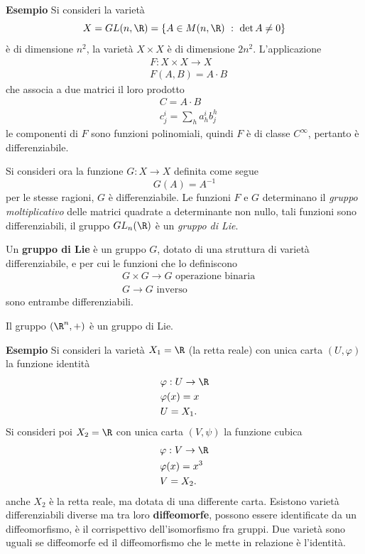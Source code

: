 \documentclass[10pt, letterpaper]{report}
\begin{document}
 \textbf{Esempio} Si consideri la varietà\begin{equation}
    X=GL(n,\R)=\{A\in M(n,\R) \ : \ \det A\ne 0\}
 \end{equation}
 è di dimensione $n^2$, la varietà $X\times X$ è di dimensione $2n^2$. L'applicazione\begin{align}
   & F:X\times X\rightarrow X\\ 
   &F(A,B)=A\cdot B
 \end{align}
 che associa a due matrici il loro prodotto\begin{align}
    &C=A\cdot B\\ 
    &c_j^i=\sum_h a_h^ib_j^h
 \end{align}
 le componenti di $F$ sono funzioni polinomiali, quindi $F$ è di classe $C^\infty$, pertanto è differenziabile.\bigskip

 Si consideri ora la funzione $G:X\rightarrow X$ definita come segue\begin{equation}
    G(A)=A^{-1}
 \end{equation}
 per le stesse ragioni, $G$ è differenziabile. Le funzioni $F$ e $G$ determinano il \textit{gruppo moltiplicativo} delle matrici quadrate a determinante non nullo, tali funzioni sono differenziabili, il gruppo $GL_n(\R)$ è un \textit{gruppo di Lie}.
 \begin{definizione}
    Un \textbf{gruppo di Lie} è un gruppo $G$, dotato di una struttura di varietà differenziabile, e per cui le funzioni che lo definiscono \begin{align}
        & G\times G\rightarrow G\text{ operazione binaria}\\ 
       & G\rightarrow G \text{ inverso}
    \end{align}
    sono entrambe differenziabili.
 \end{definizione}
 Il gruppo $(\R^n,+)$ è un gruppo di Lie.\bigskip

 \noindent\textbf{Esempio} Si consideri la varietà $X_1=\R$ (la retta reale) con unica carta $(U,\varphi)$ la funzione identità\begin{align}
    &\varphi:U\rightarrow \R\\ 
    &\varphi(x)=x\\ 
    &U=X_1.
 \end{align}
Si consideri poi $X_2=\R$  con unica carta $(V,\psi)$ la funzione cubica\begin{align}
    &\varphi:V\rightarrow \R\\ 
    &\varphi(x)=x^3\\ 
    &V=X_2.
 \end{align}
anche $X_2$ è la retta reale, ma dotata di una differente carta. Esistono varietà differenziabili diverse ma tra loro \textbf{diffeomorfe}, possono essere identificate da un diffeomorfismo, è il corrispettivo dell'isomorfismo fra gruppi. Due varietà sono uguali se diffeomorfe ed il diffeomorfismo che le mette in relazione è l'identità.\bigskip
\end{document}
